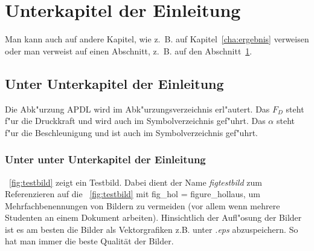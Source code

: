 \label{cha:einleitung}

\section{Unterkapitel der Einleitung}
\label{sec:unterkapitel_der_einleitung}

Man kann auch auf andere Kapitel, wie z.~B. auf Kapitel~\ref{cha:ergebnis} verweisen oder man verweist auf einen Abschnitt, z.~B. auf den Abschnitt~\ref{sec:unterkapitel_der_einleitung}.

\subsection{Unter Unterkapitel der Einleitung}
\label{sec:unter_unterkapitel_der_einleitung}

Die Abk"urzung APDL  wird im Abk"urzungsverzeichnis erl"autert. Das $F_D$   steht f"ur die Druckkraft und wird auch im Symbolverzeichnis gef"uhrt. Das $\alpha$  steht f"ur die Beschleunigung und ist auch im Symbolverzeichnis gef"uhrt.

\subsubsection{Unter unter Unterkapitel der Einleitung}
\label{sec:unter_unter_unterkapitel_der_einleitung}


\figurename~\ref{fig:testbild} zeigt ein Testbild. Dabei dient der Name \emph{fig\:testbild} zum Referenzieren auf die \figurename~\ref{fig:testbild} mit fig\_hol = figure\_hollaus, um Mehrfachbenennungen von Bildern zu vermeiden (vor allem wenn mehrere Studenten an einem Dokument arbeiten). Hinsichtlich der Aufl"osung der Bilder ist es am besten die Bilder als Vektorgrafiken z.B. unter \emph{.eps} abzuspeichern. So hat man immer die beste Qualität der Bilder.

